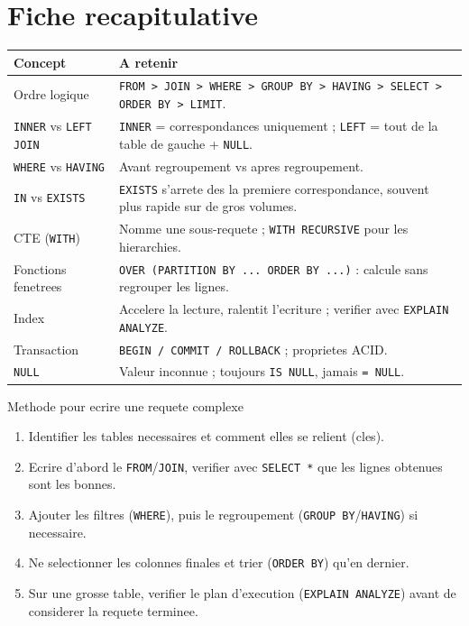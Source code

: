 \documentclass[11pt,a4paper]{article}
\begin{document}
\section{Fiche recapitulative}
\renewcommand{\arraystretch}{1.35}
\begin{longtable}{>{\raggedright\arraybackslash}p{4.5cm}
                  >{\raggedright\arraybackslash}p{8.3cm}}
\rowcolor{primary}
\textbf{\color{white}Concept} & \textbf{\color{white}A retenir} \\
\hline
Ordre logique & \texttt{FROM > JOIN > WHERE > GROUP BY > HAVING > SELECT >
ORDER BY > LIMIT}. \\
\texttt{INNER} vs \texttt{LEFT JOIN} & \texttt{INNER} = correspondances
uniquement ; \texttt{LEFT} = tout de la table de gauche + \texttt{NULL}. \\
\texttt{WHERE} vs \texttt{HAVING} & Avant regroupement vs apres regroupement. \\
\texttt{IN} vs \texttt{EXISTS} & \texttt{EXISTS} s'arrete des la premiere
correspondance, souvent plus rapide sur de gros volumes. \\
CTE (\texttt{WITH}) & Nomme une sous-requete ; \texttt{WITH RECURSIVE} pour les
hierarchies. \\
Fonctions fenetrees & \texttt{OVER (PARTITION BY ... ORDER BY ...)} : calcule
sans regrouper les lignes. \\
Index & Accelere la lecture, ralentit l'ecriture ; verifier avec
\texttt{EXPLAIN ANALYZE}. \\
Transaction & \texttt{BEGIN / COMMIT / ROLLBACK} ; proprietes ACID. \\
\texttt{NULL} & Valeur inconnue ; toujours \texttt{IS NULL}, jamais \texttt{=
NULL}. \\
\end{longtable}

\vspace{0.6cm}
\begin{infobox}{Methode pour ecrire une requete complexe}
\begin{enumerate}[leftmargin=*,itemsep=2pt,topsep=2pt]
  \item Identifier les tables necessaires et comment elles se relient (cles).
  \item Ecrire d'abord le \texttt{FROM}/\texttt{JOIN}, verifier avec
  \texttt{SELECT *} que les lignes obtenues sont les bonnes.
  \item Ajouter les filtres (\texttt{WHERE}), puis le regroupement
  (\texttt{GROUP BY}/\texttt{HAVING}) si necessaire.
  \item Ne selectionner les colonnes finales et trier (\texttt{ORDER BY}) qu'en
  dernier.
  \item Sur une grosse table, verifier le plan d'execution
  (\texttt{EXPLAIN ANALYZE}) avant de considerer la requete terminee.
\end{enumerate}
\end{infobox}
\end{document}
